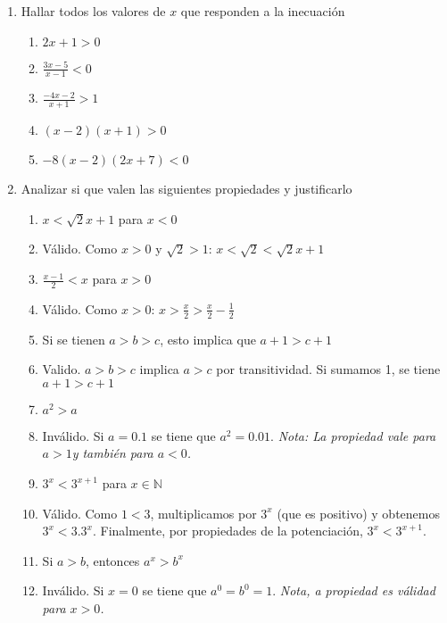 \documentclass[a4paper]{article}
\newcommand{\answer}{\item[**]}
\newcommand{\exercise}{\item}
\begin{document}
\begin{enumerate}
\begin{enumerate} [label=(\alph*)]
	\end{enumerate}

	\exercise Hallar todos los valores de $x$ que responden a la inecuación
	\begin{enumerate} [label=(\alph*)]
		\item $2x+1>0$

		\item $\displaystyle\frac{3x-5}{x-1}<0$

		\item $\displaystyle\frac{-4x-2}{x+1}>1$

		\item $(x-2)(x+1)>0$

		\item $-8(x-2)(2x+7)<0$
	
	\end{enumerate}


	\exercise Analizar si que valen las siguientes propiedades y justificarlo
	\begin{multicols}{2}
	\begin{enumerate} [label=(\alph*)]
		\item $x < \sqrt{2} x +1$ para $x<0$
		\answer Válido. Como $x>0$ y $\sqrt{2}>1$: $x < \sqrt{2} < \sqrt{2} x +1$
		
		\item $\displaystyle\frac{x-1}{2} < x$ para $x>0$
		\answer Válido. Como $x>0$: $x > \displaystyle\frac{x}{2} > \displaystyle\frac{x}{2}-\displaystyle\frac{1}{2}$ 

		\item Si se tienen $a>b>c$, esto implica que $a+1>c+1$
		\answer	Valido. $a>b>c$ implica $a>c$ por transitividad. Si sumamos 1, se tiene $a+1>c+1$

		\item $a^2 > a$
		\answer Inválido. Si $a=0.1$ se tiene que $a^2=0.01$. \textit{Nota: La propiedad vale para $a>1$y también para $a<0$.}

		\item $3^{x} < 3^{x+1}$ para $x \in \mathbb{N}$
		\answer Válido. Como $1 < 3$, multiplicamos por $3^{x}$ (que es positivo) y obtenemos $3^{x} < 3.3^{x}$. Finalmente, por propiedades de la potenciación, $3^{x} < 3^{x+1}$.

		\item Si $a>b$, entonces $a^x > b^x$
		\answer Inválido. Si $x=0$ se tiene que $a^0=b^0=1$. \textit{Nota, a propiedad es válidad para $x>0$.}


\end{enumerate}
\end{multicols}
\end{enumerate}
\end{document}
